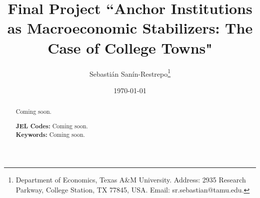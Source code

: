 


\title{\Large \textbf{Final Project ``Anchor Institutions as Macroeconomic Stabilizers: The Case of College Towns"}}

\author{Sebasti\'an San\'in-Restrepo\thanks{Department of Economics, Texas A\&M University. Address: 2935 Research Parkway, College Station, TX 77845, USA. Email: sr.sebastian@tamu.edu.}} 
\date{\today}

\maketitle
\thispagestyle{empty} 
\doublespacing
\thispagestyle{empty} 

\vspace{-10mm}
\renewcommand{\abstractname}{Abstract}
\begin{abstract} 
	\normalsize 
	\vspace{-5mm}
	
	\noindent Coming soon.\\ 
	\vspace{-5mm}
	
	\onehalfspacing
	\noindent \textbf{JEL Codes:} Coming soon.\\
	\noindent \textbf{Keywords:} Coming soon.
\end{abstract}

\pagebreak
{}

\doublespacing
















\newpage
\singlespacing



\pagebreak
\renewcommand*{\thepage}{A.\arabic{page}}
\setcounter{page}{0}
\setcounter{equation}{0}
\renewcommand{\theequation}{A.\arabic{equation}}
\setcounter{section}{0}
\renewcommand{\thesection}{A.\arabic{section}}
\renewcommand{\thefigure}{A.\arabic{figure}}
\setcounter{figure}{0}
\renewcommand{\thetable}{A.\arabic{table}}
\setcounter{table}{0}
\thispagestyle{empty}


